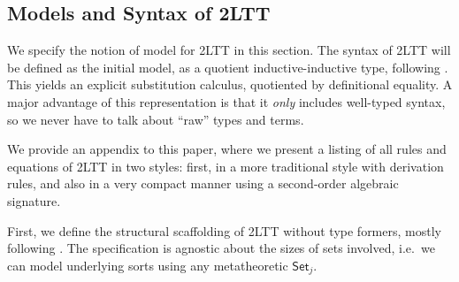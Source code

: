 \documentclass[acmsmall,screen]{acmart}
\newcommand{\Set}{\mathsf{Set}}
\theoremstyle{remark}
\begin{document}
\subsection{Models and Syntax of 2LTT}\label{sec:2lttmod}

We specify the notion of model for 2LTT in this section. The syntax of 2LTT will
be defined as the initial model, as a quotient inductive-inductive type,
following \cite{ttintt}. This yields an explicit substitution calculus,
quotiented by definitional equality. A major advantage of this representation is
that it \emph{only} includes well-typed syntax, so we never have to talk about
``raw'' types and terms.

We provide an appendix to this paper, where we present a listing of all rules
and equations of 2LTT in two styles: first, in a more traditional style with
derivation rules, and also in a very compact manner using a second-order
algebraic signature.

First, we define the structural scaffolding of 2LTT without type formers, mostly
following \cite{twolevel}. The specification is agnostic about the sizes of sets
involved, i.e.\ we can model underlying sorts using any metatheoretic $\Set_j$.
\end{document}
